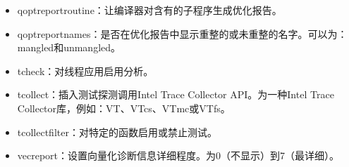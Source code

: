 \documentclass[a4paper,12pt,english]{sphinxmanual}
\begin{document}
\begin{itemize}
\item {} 
\sphinxAtStartPar
\sphinxhyphen{}qopt\sphinxhyphen{}report\sphinxhyphen{}routine：让编译器对含有的子程序生成优化报告。

\item {} 
\sphinxAtStartPar
\sphinxhyphen{}qopt\sphinxhyphen{}report\sphinxhyphen{}names：是否在优化报告中显示重整的或未重整的名字。可以为：mangled和unmangled。

\item {} 
\sphinxAtStartPar
\sphinxhyphen{}tcheck：对线程应用启用分析。

\item {} 
\sphinxAtStartPar
\sphinxhyphen{}tcollect\sphinxstyleemphasis{{[}lib{]}}：插入测试探测调用Intel Trace Collector API。为一种Intel Trace Collector库，例如：VT、VTcs、VTmc或VTfs。

\item {} 
\sphinxAtStartPar
\sphinxhyphen{}tcollect\sphinxhyphen{}filter：对特定的函数启用或禁止测试。

\item {} 
\sphinxAtStartPar
\sphinxhyphen{}vec\sphinxhyphen{}report\sphinxstyleemphasis{{[}=n{]}}：设置向量化诊断信息详细程度。为0（不显示）到7（最详细）。

\end{itemize}
\end{document}
